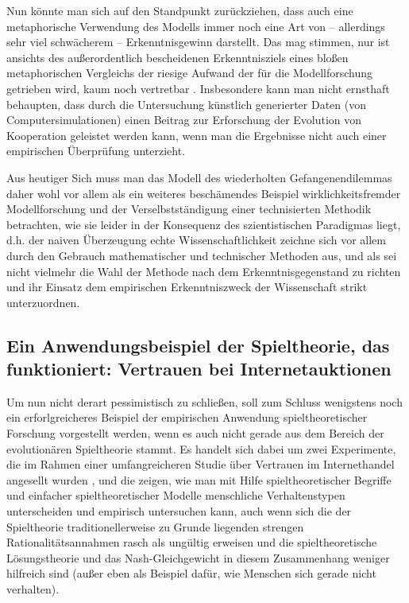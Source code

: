 Nun könnte man sich auf den Standpunkt zurückziehen, dass auch eine
metaphorische Verwendung des Modells immer noch eine Art von -- allerdings sehr
viel schwächerem -- Erkenntnisgewinn darstellt. Das mag stimmen, nur ist
ansichts des außerordentlich bescheidenen Erkenntnisziels eines bloßen
metaphorischen Vergleichs der riesige Aufwand der für die Modellforschung
getrieben wird, kaum noch vertretbar \cite[]{hammerstein:2003a}. Insbesondere
kann man nicht ernsthaft behaupten, dass durch die Untersuchung 
künstlich generierter Daten (von Computersimulationen) einen Beitrag zur 
Erforschung der Evolution von Kooperation geleistet werden kann, wenn man die 
Ergebnisse nicht auch einer empirischen Überprüfung unterzieht. 

Aus heutiger
Sich muss man das Modell des wiederholten Gefangenendilemmas daher wohl vor
allem als ein weiteres beschämendes Beispiel wirklichkeitsfremder
Modellforschung und der Verselbstständigung einer technisierten
Methodik betrachten, wie sie leider in der Konsequenz des szientistischen
Paradigmas liegt, d.h. der naiven Überzeugung echte Wissenschaftlichkeit
zeichne sich vor allem durch den Gebrauch mathematischer und technischer
Methoden aus, und als sei nicht vielmehr die Wahl der Methode nach dem
Erkenntnisgegenstand zu richten und ihr Einsatz dem empirischen
Erkenntniszweck der Wissenschaft strikt unterzuordnen. 

\subsection{Ein Anwendungsbeispiel der Spieltheorie, das funktioniert: Vertrauen
bei Internetauktionen}

Um nun nicht derart pessimistisch zu schließen, soll zum Schluss wenigstens
noch ein erforlgreicheres Beispiel der empirischen Anwendung spieltheoretischer
Forschung vorgestellt werden, wenn es auch nicht gerade aus dem Bereich der
evolutionären Spieltheorie stammt. Es handelt sich dabei um zwei Experimente,
die im Rahmen einer umfangreicheren Studie über Vertrauen im Internethandel
angesellt wurden \cite[]{bolton-katok-ockenfels:2004}, und die zeigen, wie man
mit Hilfe spieltheoretischer Begriffe und einfacher spieltheoretischer Modelle 
menschliche Verhaltenstypen
unterscheiden und empirisch untersuchen kann, auch wenn sich die der
Spieltheorie traditionellerweise zu Grunde liegenden strengen
Rationalitätsannahmen rasch als ungültig erweisen und die spieltheoretische
Lösungstheorie und das Nash-Gleichgewicht in diesem Zusammenhang weniger
hilfreich sind (außer eben als Beispiel dafür, wie Menschen sich gerade nicht
verhalten).

